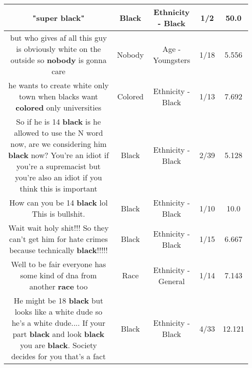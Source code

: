 \documentclass[11pt]{article}
\newlength\mylength
\begin{document}
\begin{center}
\begin{longtable}{|C{.65\mylength}|C{.30\mylength}|C{.12\mylength}|C{.12\mylength}|C{.12\mylength}|}
  \small "super \textbf{black}"\normalsize   & Black & Ethnicity - Black & 1/2 & 50.0 \\  \hline
  \small but who gives af all this guy is obviously white on the outside so \textbf{nobody} is gonna care\normalsize   & Nobody & Age - Youngsters & 1/18 & 5.556 \\  \hline
  \small he wants to create white only town when blacks want \textbf{colored} only universities\normalsize   & Colored & Ethnicity - Black & 1/13 & 7.692 \\  \hline
  \small So if he is 14 \textbf{black} is he allowed to use the N word now, are we considering him \textbf{black} now? You're an idiot if you're a supremacist but you're also an idiot if you think this is important\normalsize   & Black & Ethnicity - Black & 2/39 & 5.128 \\  \hline
  \small How can you be 14 \textbf{black} lol This is bullshit.\normalsize   & Black & Ethnicity - Black & 1/10 & 10.0 \\  \hline
  \small Wait wait holy shit!!! So they can't get him for hate crimes because technically \textbf{black}!!!!!\normalsize   & Black & Ethnicity - Black & 1/15 & 6.667 \\  \hline
  \small Well to be fair everyone has some kind of dna from another \textbf{race} too\normalsize   & Race & Ethnicity - General & 1/14 & 7.143 \\  \hline
  \small He might be 18 \textbf{black} but looks like a white dude so he's a white dude.... If your part \textbf{black} and look \textbf{black} you are \textbf{black}. Society decides for you that's a fact\normalsize   & Black & Ethnicity - Black & 4/33 & 12.121 \\  \hline

\end{longtable}
\end{center}
\end{document}
